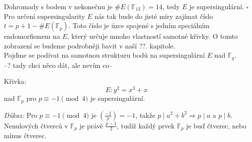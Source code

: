 \documentclass [12pt]{report}
\begin{document}



Dohromady s bodem v nekonečnu je $\#E(\mathbb{F}_{13}) = 14$, tedy $E$ je supersingulární. \hfill $\square$ \\


Pro určení supersingularity $E$ nás tak bude do jisté míry zajímat číslo $t = p+1 - \# E(\mathbb{F}_p)$. Toto číslo je úzce spojené s jedním speciálním endomorfismem na $E$, který určuje mnoho vlastností samotné křivky. O tomto zobrazení se budeme podrobněji bavit v naší ??. kapitole.\\

Pojďme se podívat na samotnou strukturu bodů na supersingulární $E$ nad $\mathbb{F}_q$. \\

--? tady chci něco dát, ale nevím co--

\begin{veta}
Křivka:
 $$E : y^2 = x^3 + x$$
nad $\mathbb{F}_{p}$ pro $ p \equiv -1 \pmod{4}$ je supersingulární.
\end{veta}
\textit{Důkaz: } Pro $p \equiv -1 \pmod{4}$ je $\genfrac{(}{)}{}{}{-1}{p} = -1$, takže $p \mid a^2 + b^2 \Rightarrow p \mid a$ a $p \mid b$. Nenulových čtverců v $\mathbb{F}_p$ je právě $\frac{p-1}{2}$, tudíž každý prvek $\mathbb{F}_p$ je buď čtverec, nebo mínus čtverec.\\
\end{document}
